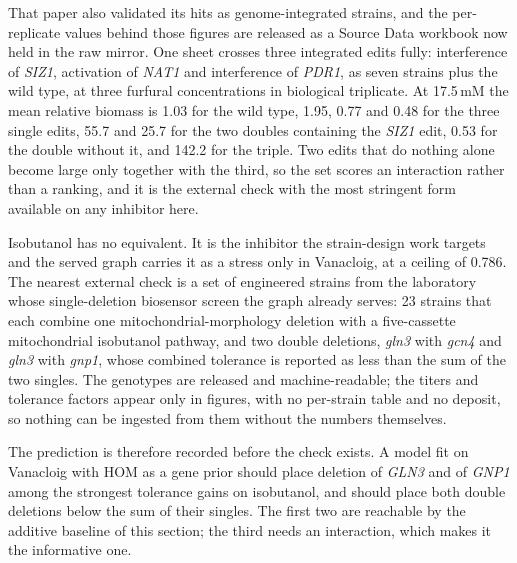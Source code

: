 That paper also validated its hits as genome-integrated strains, and the per-replicate
values behind those figures are released as a Source Data workbook now held in the raw
mirror. One sheet crosses three integrated edits fully: interference of \emph{SIZ1},
activation of \emph{NAT1} and interference of \emph{PDR1}, as seven strains plus the wild
type, at three furfural concentrations in biological triplicate. At 17.5\,mM the mean
relative biomass is 1.03 for the wild type, 1.95, 0.77 and 0.48 for the three single
edits, 55.7 and 25.7 for the two doubles containing the \emph{SIZ1} edit, 0.53 for the
double without it, and 142.2 for the triple. Two edits that do nothing alone become large
only together with the third, so the set scores an interaction rather than a ranking, and
it is the external check with the most stringent form available on any inhibitor here.

Isobutanol has no equivalent. It is the inhibitor the strain-design work targets and the
served graph carries it as a stress only in Vanacloig, at a ceiling of 0.786. The nearest
external check is a set of engineered strains from the laboratory whose single-deletion
biosensor screen the graph already serves: 23 strains that each combine one
mitochondrial-morphology deletion with a five-cassette mitochondrial isobutanol pathway,
and two double deletions, \emph{gln3} with \emph{gcn4} and \emph{gln3} with \emph{gnp1},
whose combined tolerance is reported as less than the sum of the two singles. The
genotypes are released and machine-readable; the titers and tolerance factors appear only
in figures, with no per-strain table and no deposit, so nothing can be ingested from them
without the numbers themselves.

The prediction is therefore recorded before the check exists. A model fit on Vanacloig
with HOM as a gene prior should place deletion of \emph{GLN3} and of \emph{GNP1} among the
strongest tolerance gains on isobutanol, and should place both double deletions below the
sum of their singles. The first two are reachable by the additive baseline of this section;
the third needs an interaction, which makes it the informative one.
